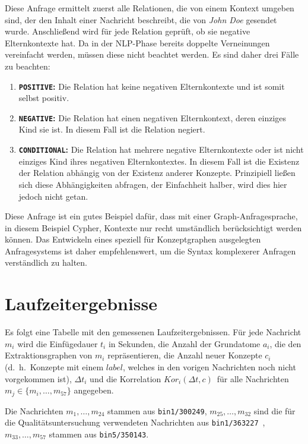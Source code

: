 \inputminted{cypher}{data/evaluation/personNegationAction.cql}
Diese Anfrage ermittelt zuerst alle Relationen, die von einem Kontext umgeben sind, der den Inhalt einer Nachricht beschreibt, die von \textit{John Doe} gesendet wurde.
Anschließend wird für jede Relation geprüft, ob sie negative Elternkontexte hat.
Da in der NLP-Phase bereits doppelte Verneinungen vereinfacht werden, müssen diese nicht beachtet werden.
Es sind daher drei Fälle zu beachten:
\begin{enumerate}
	\item \textbf{\texttt{POSITIVE}:}
		Die Relation hat keine negativen Elternkontexte und ist somit selbst positiv.
	\item \textbf{\texttt{NEGATIVE}:}
		Die Relation hat einen negativen Elternkontext, deren einziges Kind sie ist.
		In diesem Fall ist die Relation negiert.
	\item \textbf{\texttt{CONDITIONAL}:}
		Die Relation hat mehrere negative Elternkontexte oder ist nicht einziges Kind ihres negativen Elternkontextes.
		In diesem Fall ist die Existenz der Relation abhängig von der Existenz anderer Konzepte.
		Prinzipiell ließen sich diese Abhängigkeiten abfragen, der Einfachheit halber, wird dies hier jedoch nicht getan.
\end{enumerate}
Diese Anfrage ist ein gutes Beispiel dafür, dass mit einer Graph-Anfragesprache, in diesem Beispiel Cypher, Kontexte nur recht umständlich berücksichtigt werden können.
Das Entwickeln eines speziell für Konzeptgraphen ausgelegten Anfragesystems ist daher empfehlenswert, um die Syntax komplexerer Anfragen verständlich zu halten.

\section{Laufzeitergebnisse}%
\label{sec:appendix:perf}

\def\kor{$Kor_i(\Delta t, c)$}
Es folgt eine Tabelle mit den gemessenen Laufzeitergebnissen.
Für jede Nachricht $m_i$ wird die Einfügedauer $t_i$ in Sekunden, die Anzahl der Grundatome $a_i$, die den Extraktionsgraphen von $m_i$ repräsentieren, die Anzahl neuer Konzepte $c_i$ (d.~h.\ Konzepte mit einem $label$, welches in den vorigen Nachrichten noch nicht vorgekommen ist), $\Delta t_i$ und die Korrelation \kor\ für alle Nachrichten $m_j \in \{ m_i, \dots, m_{57} \}$ angegeben.

Die Nachrichten $m_1, \dots, m_{24}$ stammen aus \texttt{bin1/300249}, $m_{25}, \dots, m_{32}$ sind die für die Qualitätsuntersuchung verwendeten Nachrichten aus \texttt{bin1/363227}~, $m_{33}, \dots, m_{57}$ stammen aus \texttt{bin5/350143}.
\csvautobooklongtable[
	separator=comma,
	table head=\toprule$i$ & $t_i$ & $a_i$ & $c_i$ & $\Delta t_i$ & \kor\\\midrule, %
]{data/evaluation/perfBig.csv}
